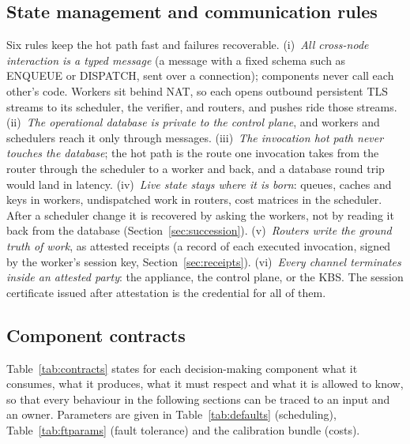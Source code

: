 \subsection{State management and communication rules}
Six rules keep the hot path fast and failures recoverable.
(i)~\emph{All cross-node interaction is a typed message} (a message with a fixed schema such as ENQUEUE or DISPATCH, sent over a connection); components never call each other's code. Workers sit behind NAT, so each opens outbound
persistent TLS streams to its scheduler, the verifier, and routers, and pushes ride those streams.
(ii)~\emph{The operational database is private to the control plane}, and workers and schedulers reach it only through
messages.
(iii)~\emph{The invocation hot path never touches the database}; the hot path is the route one invocation takes from the router through the scheduler to a worker and back, and a database round trip would land in latency.
(iv)~\emph{Live state stays where it is born}: queues, caches and keys in workers, undispatched work in routers, cost matrices in the
scheduler. After a scheduler change it is recovered by asking the workers, not by reading it back from the database
(Section~\ref{sec:succession}).
(v)~\emph{Routers write the ground truth of work}, as attested receipts (a record of each executed invocation, signed by the worker's session key, Section~\ref{sec:receipts}).
(vi)~\emph{Every channel terminates inside an attested party}: the appliance, the control plane, or the KBS. The session certificate
issued after attestation is the credential for all of them.

\subsection{Component contracts}
\label{sec:contracts}
Table~\ref{tab:contracts} states for each decision-making component what it consumes, what it produces, what it must respect and what it is allowed to know, so that every behaviour in the following sections can be traced to an input and an owner. Parameters are given in Table~\ref{tab:defaults} (scheduling), Table~\ref{tab:ftparams} (fault tolerance) and the calibration bundle (costs).

